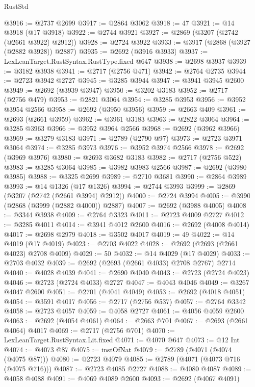 \begin{lexlean}{RustStd}
\begin{coremodule}
@3916 := @2737 @2699
@3917 := @2864 @3062
@3918 := 47
@3921 := @14 @3918 (@17 @3918)
@3922 := @2744 @3921
@3927 := @2869 (@3207 (@2742 (@2661 @3922) @2912))
@3928 := @2724 @3922
@3933 := @3917 (@2868 (@3927 (@2882 @3928)) @2887)
@3935 := @2692 (@3916 @3933)
@3937 := LexLeanTarget.RustSyntax.RustType.fixed @647
@3938 := @2698 @3937
@3939 := @3182 @3938
@3941 := @2717 (@2756 @471)
@3942 := @2764 @2735
@3944 := @2723 @3942 @2727
@3945 := @3285 @3944
@3947 := @3941 @3945 @2600
@3949 := @2692 (@3939 @3947)
@3950 := @3202 @3183
@3952 := @2717 (@2756 @479)
@3953 := @2821 @3064
@3954 := @3285 @3953
@3956 := @3952 @3954 @2566
@3958 := @2692 (@3950 @3956)
@3959 := @2663 @409
@3961 := @2693 (@2661 @3959)
@3962 := @3961 @3183
@3963 := @2822 @3064
@3964 := @3285 @3963
@3966 := @3952 @3964 @2566
@3968 := @2692 (@3962 @3966)
@3969 := @3279 @3183
@3971 := @2789 (@2790 @97)
@3973 := @2723 @3971 @3064
@3974 := @3285 @3973
@3976 := @3952 @3974 @2566
@3978 := @2692 (@3969 @3976)
@3980 := @2693 @3682 @3183
@3982 := @2717 (@2756 @522)
@3983 := @3285 @3064
@3985 := @3982 @3983 @2566
@3987 := @2692 (@3980 @3985)
@3988 := @3325 @2699
@3989 := @2710 @3681
@3990 := @2864 @3989
@3993 := @14 @1326 (@17 @1326)
@3994 := @2744 @3993
@3999 := @2869 (@3207 (@2742 (@2661 @3994) @2912))
@4000 := @2724 @3994
@4005 := @3990 (@2868 (@3999 (@2882 @4000)) @2887)
@4007 := @2692 (@3988 @4005)
@4008 := @3344 @3938
@4009 := @2764 @3323
@4011 := @2723 @4009 @2727
@4012 := @3285 @4011
@4014 := @3941 @4012 @2600
@4016 := @2692 (@4008 @4014)
@4017 := @2698 @2979
@4018 := @3502 @4017
@4019 := 49
@4022 := @14 @4019 (@17 @4019)
@4023 := @2703 @4022
@4028 := @2692 (@2693 (@2661 @4023) @2708 @4009)
@4029 := 50
@4032 := @14 @4029 (@17 @4029)
@4033 := @2703 @4032
@4039 := @2692 (@2693 (@2661 @4033) @2708 @2767) @2714
@4040 := @4028 @4039
@4041 := @2690 @4040
@4043 := @2723 (@2724 @4023)
@4046 := @2723 (@2724 @4033) @2727
@4047 := @4043 @4046
@4049 := @3267 @4047 @2600
@4051 := @2701 (@4041 @4049)
@4053 := @2692 (@4018 @4051)
@4054 := @3591 @4017
@4056 := @2717 (@2756 @537)
@4057 := @2764 @3342
@4058 := @2723 @4057
@4059 := @4058 @2727
@4061 := @4056 @4059 @2600
@4063 := @2692 (@4054 @4061)
@4064 := @2663 @701
@4067 := @2693 (@2661 @4064) @4017
@4069 := @2717 (@2756 @701)
@4070 := LexLeanTarget.RustSyntax.Lit.fixed
@4071 := @4070 @647
@4073 := @12 Int
@4074 := @4073 @87
@4075 := instOfNat
@4079 := @2789 (@4071 (@4074 (@4075 @87)))
@4080 := @2723 @4079
@4085 := @2789 (@4071 (@4073 @716 (@4075 @716)))
@4087 := @2723 @4085 @2727
@4088 := @4080 @4087
@4089 := @4058 @4088
@4091 := @4069 @4089 @2600
@4093 := @2692 (@4067 @4091)

\end{coremodule}
\end{lexlean}
